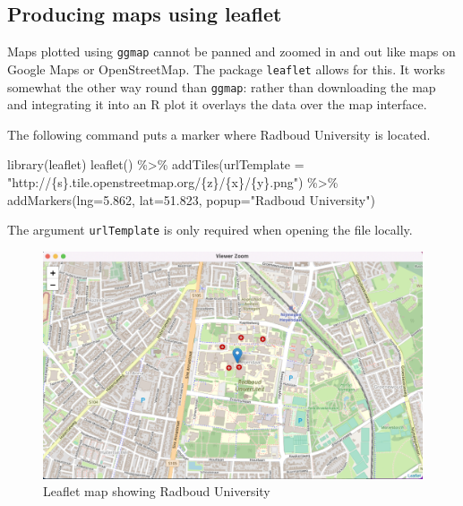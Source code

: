 \documentclass[
]{book}
\newenvironment{Shaded}{\begin{snugshade}}{\end{snugshade}}
\newcommand{\AttributeTok}[1]{\textcolor[rgb]{0.77,0.63,0.00}{#1}}
\newcommand{\FloatTok}[1]{\textcolor[rgb]{0.00,0.00,0.81}{#1}}
\newcommand{\FunctionTok}[1]{\textcolor[rgb]{0.00,0.00,0.00}{#1}}
\newcommand{\NormalTok}[1]{#1}
\newcommand{\SpecialCharTok}[1]{\textcolor[rgb]{0.00,0.00,0.00}{#1}}
\newcommand{\StringTok}[1]{\textcolor[rgb]{0.31,0.60,0.02}{#1}}
\begin{document}
\hypertarget{producing-maps-using-leaflet}{%
\subsection{Producing maps using leaflet}\label{producing-maps-using-leaflet}}

Maps plotted using \texttt{ggmap} cannot be panned and zoomed in and out like maps on Google Maps or OpenStreetMap. The package \texttt{leaflet} allows for this. It works somewhat the other way round than \texttt{ggmap}: rather than downloading the map and integrating it into an R plot it overlays the data over the map interface.

The following command puts a marker where Radboud University is located.

\begin{Shaded}
\begin{Highlighting}[]
\FunctionTok{library}\NormalTok{(leaflet)}
\FunctionTok{leaflet}\NormalTok{() }\SpecialCharTok{\%\textgreater{}\%}
   \FunctionTok{addTiles}\NormalTok{(}\AttributeTok{urlTemplate =} \StringTok{"http://\{s\}.tile.openstreetmap.org/\{z\}/\{x\}/\{y\}.png"}\NormalTok{) }\SpecialCharTok{\%\textgreater{}\%} 
   \FunctionTok{addMarkers}\NormalTok{(}\AttributeTok{lng=}\FloatTok{5.862}\NormalTok{, }\AttributeTok{lat=}\FloatTok{51.823}\NormalTok{, }\AttributeTok{popup=}\StringTok{"Radboud University"}\NormalTok{)}
\end{Highlighting}
\end{Shaded}

The argument \texttt{urlTemplate} is only required when opening the file locally.

\begin{figure}
\centering
\includegraphics{leaflet1.png}
\caption{Leaflet map showing Radboud University}
\end{figure}
\end{document}
